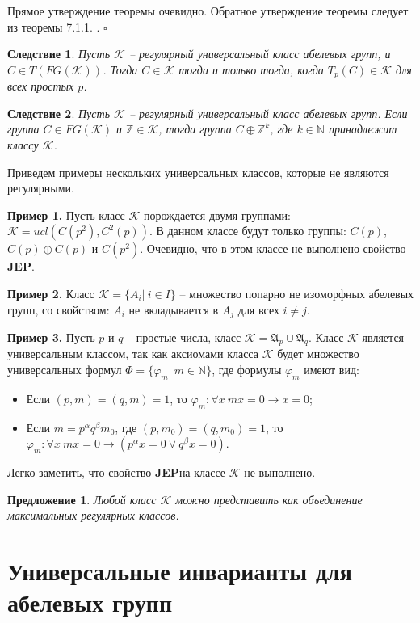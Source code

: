 \documentclass[a4paper,11pt,twoside]{article}
\newtheorem{proposition}{Предложение}[section]
\newtheorem{corollary}{Следствие}[section]
\def\proof{{\noindent{\bf Доказательство.}} }
\def\A{{\mathfrak{A}}}
\def\K{{\mathcal{K}}}
\def\Z{{\mathbb{Z}}}
\def\N{{\mathbb{N}}}
\def\JEP{{\textbf{JEP}}}
\begin{document}
\proof Прямое утверждение теоремы очевидно. Обратное утверждение теоремы следует из теоремы 7.1.1. \cite{Hodges}. $\square$

\begin{corollary}
Пусть $\K$ -- регулярный универсальный класс абелевых групп, и $C \in T(FG(\K))$. Тогда $C \in \K$ тогда и только тогда, когда $T_p(C) \in \K$ для всех простых $p$.
\end{corollary}

\begin{corollary}
Пусть $\K$ -- регулярный универсальный класс абелевых групп. Если группа $C \in FG(\K)$ и $\Z \in \K$, тогда группа $C \oplus \Z^k$, где $k \in \N$ принадлежит классу $\K$.
\end{corollary}

Приведем примеры нескольких универсальных классов, которые не являются регулярными.

\noindent \textbf{Пример 1.} Пусть класс $\K$ порождается двумя группами: $\K = ucl(C(p^2), C^2(p))$. В данном классе будут только группы: $C(p)$, $C(p) \oplus C(p)$ и $C(p^2)$. Очевидно, что в этом классе не выполнено свойство \JEP.

\noindent \textbf{Пример 2.} Класс $\K = \{A_i | \ i \in I\}$ -- множество попарно не изоморфных абелевых групп, со свойством: $A_i$ не вкладывается в $A_j$ для всех $i \neq j$.

\noindent \textbf{Пример 3.} Пусть $p$ и $q$ -- простые числа, класс $\K = \A_p \cup \A_q$. Класс $\K$ является универсальным классом, так как аксиомами класса $\K$ будет множество универсальных формул $\Phi = \{\varphi_m | \ m \in \N\}$, где формулы $\varphi_m$ имеют вид:
\begin{itemize}
 \item Если $(p,m)=(q,m)=1$, то $\varphi_m : \forall x \ mx = 0 \rightarrow x = 0$;
 \item Если $m = p^\alpha q^\beta m_0$, где $(p,m_0)=(q,m_0)=1$, то $\varphi_m : \forall x \ mx = 0 \rightarrow (p^\alpha x = 0 \vee q^\beta x = 0)$.
\end{itemize} 
Легко заметить, что свойство \JEP на классе $\K$ не выполнено.

\begin{proposition}
Любой класс $\K$ можно представить как объединение максимальных регулярных классов.
\end{proposition}





\section{Универсальные инварианты для абелевых групп}
\end{document}
